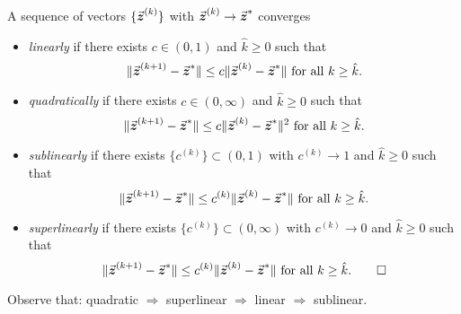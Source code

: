 \begin{definition}
\label{def:convergence_rates}
A sequence of vectors \(\{\vec{\boldsymbol{z}}^{(k)}\}\) with \(\vec{\boldsymbol{z}}^{(k)} \to \vec{\boldsymbol{z}}^{*}\) converges
\begin{itemize}
  \item \emph{linearly} if there exists \(c \in (0,1)\) and \(\hat{k} \geq 0\) such that 
  \[
  \|\vec{\boldsymbol{z}}^{(k+1)}-\vec{\boldsymbol{z}}^{*}\| \leq c\|\vec{\boldsymbol{z}}^{(k)}-\vec{\boldsymbol{z}}^{*}\| \text{ for all } k \geq \hat{k} \text{.}
  \]
  \item \emph{quadratically} if there exists \(c \in (0,\infty)\) and \(\hat{k} \geq 0\) such that
  \[
  \|\vec{\boldsymbol{z}}^{(k+1)}-\vec{\boldsymbol{z}}^{*}\| \leq c\|\vec{\boldsymbol{z}}^{(k)}-\vec{\boldsymbol{z}}^{*}\|^{2} \text{ for all } k \geq \hat{k} \text{.}
  \]
  \item \emph{sublinearly} if there exists \(\{c^{(k)}\} \subset (0,1)\) with \(c^{(k)} \to 1\) and \(\hat{k} \geq 0\) such that
  \[
  \|\vec{\boldsymbol{z}}^{(k+1)}-\vec{\boldsymbol{z}}^{*}\| \leq c^{(k)}\|\vec{\boldsymbol{z}}^{(k)}-\vec{\boldsymbol{z}}^{*}\| \text{ for all } k \geq \hat{k} \text{.}
  \]
  \item \emph{superlinearly} if there exists \(\{c^{(k)}\} \subset (0,\infty)\) with \(c^{(k)} \to 0\) and \(\hat{k} \geq 0\) such that
  \[
  \|\vec{\boldsymbol{z}}^{(k+1)}-\vec{\boldsymbol{z}}^{*}\| \leq c^{(k)}\|\vec{\boldsymbol{z}}^{(k)}-\vec{\boldsymbol{z}}^{*}\| \text{ for all } k \geq \hat{k} \text{.}\qedhere
  \]
\end{itemize}
\end{definition}

\begin{remark}
Observe that: quadratic \(\Longrightarrow\) superlinear \(\Longrightarrow\) linear \(\Longrightarrow\) sublinear.
\end{remark}


